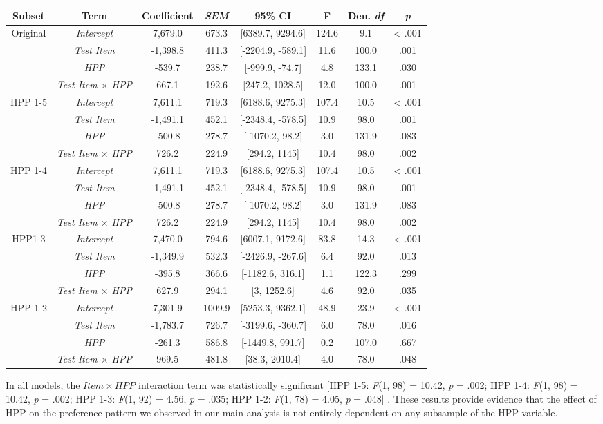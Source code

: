 \begin{appendix}
\begin{longtable}[]{@{}cccccccc@{}}
\toprule
\textbf{Subset} & \textbf{Term} & \textbf{Coefficient} &
\textbf{\emph{SEM}} & \textbf{95\% CI} & \textbf{F} & \textbf{Den.
\emph{df}} & \textbf{\emph{p}}\tabularnewline
\midrule
\endhead
Original & \emph{Intercept} & 7,679.0 & 673.3 & {[}6389.7, 9294.6{]} &
124.6 & 9.1 & \textless{} .001\tabularnewline
& \emph{Test Item} & -1,398.8 & 411.3 & {[}-2204.9, -589.1{]} & 11.6 &
100.0 & .001\tabularnewline
& \emph{HPP} & -539.7 & 238.7 & {[}-999.9, -74.7{]} & 4.8 & 133.1 &
.030\tabularnewline
& \emph{Test Item \(\times\) HPP} & 667.1 & 192.6 & {[}247.2, 1028.5{]}
& 12.0 & 100.0 & .001\tabularnewline
HPP 1-5 & \emph{Intercept} & 7,611.1 & 719.3 & {[}6188.6, 9275.3{]} &
107.4 & 10.5 & \textless{} .001\tabularnewline
& \emph{Test Item} & -1,491.1 & 452.1 & {[}-2348.4, -578.5{]} & 10.9 &
98.0 & .001\tabularnewline
& \emph{HPP} & -500.8 & 278.7 & {[}-1070.2, 98.2{]} & 3.0 & 131.9 &
.083\tabularnewline
& \emph{Test Item \(\times\) HPP} & 726.2 & 224.9 & {[}294.2, 1145{]} &
10.4 & 98.0 & .002\tabularnewline
HPP 1-4 & \emph{Intercept} & 7,611.1 & 719.3 & {[}6188.6, 9275.3{]} &
107.4 & 10.5 & \textless{} .001\tabularnewline
& \emph{Test Item} & -1,491.1 & 452.1 & {[}-2348.4, -578.5{]} & 10.9 &
98.0 & .001\tabularnewline
& \emph{HPP} & -500.8 & 278.7 & {[}-1070.2, 98.2{]} & 3.0 & 131.9 &
.083\tabularnewline
& \emph{Test Item \(\times\) HPP} & 726.2 & 224.9 & {[}294.2, 1145{]} &
10.4 & 98.0 & .002\tabularnewline
HPP1-3 & \emph{Intercept} & 7,470.0 & 794.6 & {[}6007.1, 9172.6{]} &
83.8 & 14.3 & \textless{} .001\tabularnewline
& \emph{Test Item} & -1,349.9 & 532.3 & {[}-2426.9, -267.6{]} & 6.4 &
92.0 & .013\tabularnewline
& \emph{HPP} & -395.8 & 366.6 & {[}-1182.6, 316.1{]} & 1.1 & 122.3 &
.299\tabularnewline
& \emph{Test Item \(\times\) HPP} & 627.9 & 294.1 & {[}3, 1252.6{]} &
4.6 & 92.0 & .035\tabularnewline
HPP 1-2 & \emph{Intercept} & 7,301.9 & 1009.9 & {[}5253.3, 9362.1{]} &
48.9 & 23.9 & \textless{} .001\tabularnewline
& \emph{Test Item} & -1,783.7 & 726.7 & {[}-3199.6, -360.7{]} & 6.0 &
78.0 & .016\tabularnewline
& \emph{HPP} & -261.3 & 586.8 & {[}-1449.8, 991.7{]} & 0.2 & 107.0 &
.667\tabularnewline
& \emph{Test Item \(\times\) HPP} & 969.5 & 481.8 & {[}38.3, 2010.4{]} &
4.0 & 78.0 & .048\tabularnewline
\bottomrule
\end{longtable}

In all models, the \(Item \times HPP\) interaction term was
statistically significant {[}HPP 1-5: \emph{F}(1, 98) = 10.42, \emph{p}
= .002; HPP 1-4: \emph{F}(1, 98) = 10.42, \emph{p} = .002; HPP 1-3:
\emph{F}(1, 92) = 4.56, \emph{p} = .035; HPP 1-2: \emph{F}(1, 78) =
4.05, \emph{p} = .048{]} . These results provide evidence that the
effect of HPP on the preference pattern we observed in our main analysis
is not entirely dependent on any subsample of the HPP variable.


\end{appendix}
